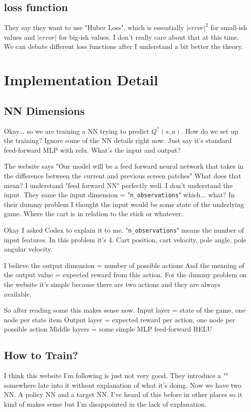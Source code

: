 \documentclass[11pt,notitlepage]{report}
\theoremstyle{definition}
\theoremstyle{plain}
\begin{document}
\subsection{loss function}
They say they want to use "Huber Loss", which is essentially $\left|error\right|^2$ for small-ish values
and $\left|error\right|$ for big-ish values. I don't really care about that at this time.
We can debate different loss functions after I understand a bit better the theory.

\section{Implementation Detail}
\subsection{NN Dimensions}
Okay... so we are training a NN trying to predict $Q^*(s,a)$. How do we set up the training?
Ignore some of the NN details right now. Just say it's standard feed-forward MLP with relu.
What's the input and output?

The website says "Our model will be a feed forward neural network that takes in the difference between the current and previous screen patches"
What does that mean? I understand "feed forward NN" perfectly well. I don't understand the input.
They same the input dimension = "\texttt{n\_observations}" which... what? In their dummy problem I thought the input would
be some state of the underlying game. Where the cart is in relation to the stick or whatever.

Okay I asked Codex to explain it to me. "\texttt{n\_observations}" means the number of input features.
In this problem it's 4. Cart position, cart velocity, pole angle, pole angular velocity.

I believe the output dimension = number of possible actions
And the meaning of the output value = expected reward from this action.
For the dummy problem on the website it's simple because there are two actions and they are always available.

So after reading some this makes sense now.
Input layer = state of the game, one node per state item
Output layer = expected reward per action, one node per possible action
Middle layers = some simple MLP feed-forward RELU

\subsection{How to Train?}
I think this website I'm following is just not very good.
They introduce a "" somewhere late into it without explanation of what it's doing.
Now we have two NN. A policy NN and a target NN. I've heard of this before in other places so it
kind of makes sense but I'm disappointed in the lack of explanation. 
\end{document}
